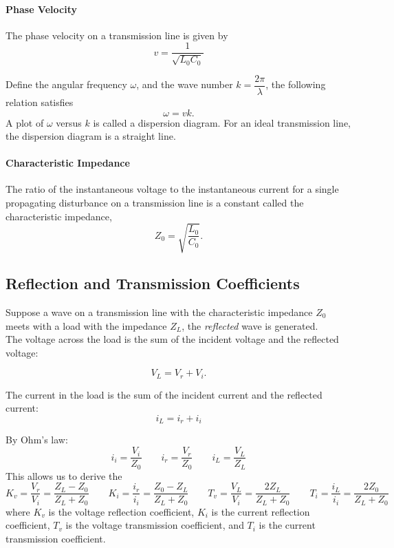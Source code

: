 \documentclass[12pt,a4paper]{article}
\begin{document}
\paragraph{Phase Velocity} The phase velocity on a transmission line is given by
\[
    v = \frac{1}{\sqrt{L_0 C_0}}
\]

Define the angular frequency $\omega$, and the wave number $k = \dfrac{2\pi}{\lambda}$, the following relation satisfies
\[
    \omega = v k.
\]
A plot of $\omega$ versus $k$ is called a dispersion diagram. For an ideal transmission line, the dispersion diagram is a straight line.

\paragraph{Characteristic Impedance} The ratio of the instantaneous voltage to the instantaneous current for a single propagating disturbance on a transmission line is a constant called the characteristic impedance, 
\[
    Z_0 = \sqrt{\frac{L_0}{C_0}}.
\]

\subsection{Reflection and Transmission Coefficients}

Suppose a wave on a transmission line with the characteristic impedance $Z_0$ meets with a load with the impedance $Z_L$, the \textit{reflected} wave is generated. \\

The voltage across the load is the sum of the incident voltage and the reflected voltage:

\[
    V_L = V_r + V_i.
\]

The current in the load is the sum of the incident current and the reflected current:
\[
    i_L = i_r + i_i
\]

By Ohm's law:
\[
    i_i = \frac{V_i}{Z_0} 
    \quad \quad
    i_r = \frac{V_r}{Z_0}
    \quad \quad
    i_L = \frac{V_L}{Z_L}
\]
This allows us to derive the 
\[
    K_v = \frac{V_r}{V_i} = \frac{Z_L - Z_0}{Z_L + Z_0}
    \quad \quad
    K_i = \frac{i_r}{i_i} = \frac{Z_0 - Z_L}{Z_L + Z_0}
    \quad \quad
    T_v = \frac{V_L}{V_i} = \frac{2Z_L}{Z_L + Z_0}
    \quad \quad
    T_i = \frac{i_L}{i_i} = \frac{2Z_0}{Z_L + Z_0}
\]
where $K_v$ is the voltage reflection coefficient, $K_i$ is the current reflection coefficient, $T_v$ is the voltage transmission coefficient, and $T_i$ is the current transmission coefficient.
\end{document}

